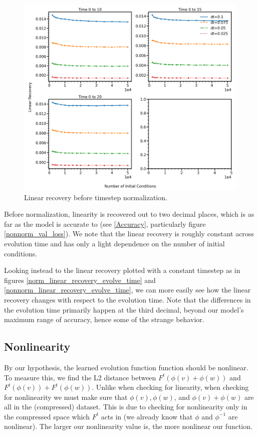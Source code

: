 \documentclass[11pt]{article} %
\numberwithin{equation}{section}  %
\begin{document}
\begin{figure}
	\centering
	
	\includegraphics[width=\linewidth]{figures/nonnorm_linear_recovery}
	
	\caption{Linear recovery before timestep normalization.}\label{nonnorm_linear_recovery}
\end{figure}


\begin{multicols}{2}

Before normalization, linearity is recovered out to two decimal places, which is as far as the model is accurate to (see \ref{Accuracy}, particularly figure \ref{nonnorm_val_loss}).  We note that the linear recovery is roughly constant across evolution time and has only a light dependence on the number of initial conditions.  

Looking instead to the linear recovery plotted with a constant timestep as in figures \ref{norm_linear_recovery_evolve_time} and \ref{nonnorm_linear_recovery_evolve_time}, we can more easily see how the linear recovery changes with respect to the evolution time.  Note that the differences in the evolution time primarily happen at the third decimal, beyond our model's maximum range of accuracy, hence some of the strange behavior.


\subsection{Nonlinearity}
By our hypothesis, the learned evolution function function should be nonlinear.  To measure this, we find the L2 distance between $F^t(\phi(v)+\phi(w))$ and $F^t(\phi(v))+F^t(\phi(w))$.  Unlike when checking for linearity, when checking for nonlinearity we must make sure that $\phi(v),\phi(w)$, and $\phi(v)+\phi(w)$ are all in the (compressed) dataset.  This is due to checking for nonlinearity only in the compressed space which $F^t$ acts in (we already know that $\phi$ and $\phi^{-1}$ are nonlinear).  The larger our nonlinearity value is, the more nonlinear our function.

\end{multicols}
\end{document}
